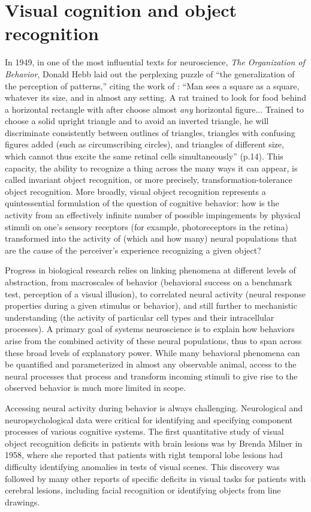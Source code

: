 \section{Visual cognition and object recognition}
In 1949, in one of the most influential texts for neuroscience, \textit{The Organization of Behavior}\cite{Hebb1949}, Donald Hebb laid out the perplexing puzzle of ``the generalization of the perception of patterns,'' citing the work of \citet{Lashley1938}:  ``Man sees a square as a square, whatever its size, and in almost any setting. A rat trained to look for food behind a horizontal rectangle with after choose almost \textit{any} horizontal figure... Trained to choose a solid upright triangle and to avoid an inverted triangle, he will discriminate consistently between outlines of triangles, triangles with confusing figures added (such as circumscribing circles), and triangles of different size, which cannot thus excite the same retinal cells simultaneously'' (p.14). This capacity, the ability to recognize a thing across the many ways it can appear, is called invariant object recognition, or more precisely, transformation-tolerance object recognition. More broadly, visual object recognition represents a quintessential formulation of the question of cognitive behavior:  how is the activity from an effectively infinite number of possible impingements by physical stimuli on one's sensory receptors (for example, photoreceptors in the retina) transformed into the activity of (which and how many) neural populations that are the cause of the perceiver's experience recognizing a given object?

Progress in biological research relies on linking phenomena at different levels of abstraction, from macroscales of behavior (behavioral success on a benchmark test, perception of a visual illusion), to correlated neural activity (neural response properties during a given stimulus or behavior), and still further to mechanistic understanding (the activity of particular cell types and their intracellular processes). A primary goal of systems neuroscience is to explain how behaviors arise from the combined activity of these neural populations, thus to span across these broad levels of explanatory power. While many behavioral phenomena can be quantified and parameterized in almost any observable animal, access to the neural processes that process and transform incoming stimuli to give rise to the observed behavior is much more limited in scope. 

Accessing neural activity during behavior is always challenging. Neurological and neuropsychological data were critical for identifying and specifying component processes of various cognitive systems. The first quantitative study of visual object recognition deficits in patients with brain lesions was by Brenda Milner in 1958, where she reported that patients with right temporal lobe lesions had difficulty identifying anomalies in tests of visual scenes\cite{Milner1958}. This discovery was followed by many other reports of specific deficits in visual tasks for patients with cerebral lesions, including facial recognition or identifying objects from line drawings\cite{Warrington1967,Newcombe1969}. 

